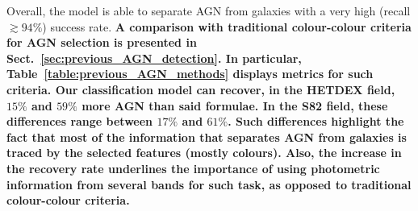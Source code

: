 \documentclass{aa}
\begin{document}
Overall, the model is able to separate AGN from galaxies with a very high (recall ${\gtrsim} 94\%$) success rate. \textbf{A comparison with traditional colour-colour criteria for AGN selection is presented in Sect.~\ref{sec:previous_AGN_detection}. In particular, Table~\ref{table:previous_AGN_methods} displays metrics for such criteria. Our classification model can recover, in the HETDEX field, $15\%$ and $59\%$ more AGN than said formulae. In the S82 field, these differences range between $17\%$ and $61\%$. Such differences highlight the fact that most of the information that separates AGN from galaxies is traced by the selected features (mostly colours). Also, the increase in the recovery rate underlines the importance of using photometric information \textbf{from several bands} for such task, as opposed to traditional colour-colour criteria.}
\end{document}
